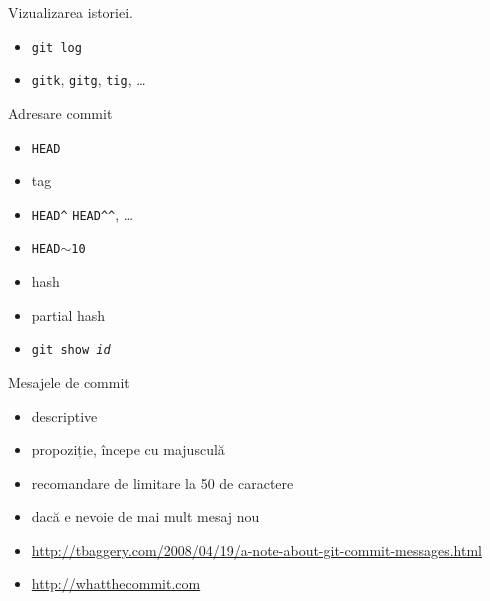 \documentclass{beamer}
\begin{document}
\begin{frame}{Vizualizarea istoriei.}
  \begin{itemize}
    \item \texttt{git log}
    \item \texttt{gitk}, \texttt{gitg}, \texttt{tig}, \ldots
  \end{itemize}
\end{frame}

\begin{frame}{Adresare commit}
  \begin{itemize}
    \item \texttt{HEAD}
    \item tag
    \item \texttt{HEAD\textasciicircum}
      \texttt{HEAD\textasciicircum\textasciicircum}, \ldots
    \item \texttt{HEAD$\sim$10}
    \item hash
    \item partial hash
  \end{itemize}
%
  \begin{itemize}
    \item \texttt{git show \textit{id}}
  \end{itemize}
\end{frame}

\begin{frame}{Mesajele de commit}
  \begin{itemize}
    \item descriptive
    \item propoziție, începe cu majusculă
    \item recomandare de limitare la 50 de caractere
    \item dacă e nevoie de mai mult mesaj nou
    \scriptsize
    \item
      \url{http://tbaggery.com/2008/04/19/a-note-about-git-commit-messages.html}
    \normalsize
    \item \url{http://whatthecommit.com}
  \end{itemize}
  \begin{center}
  \end{center}
\end{frame}
\end{document}

